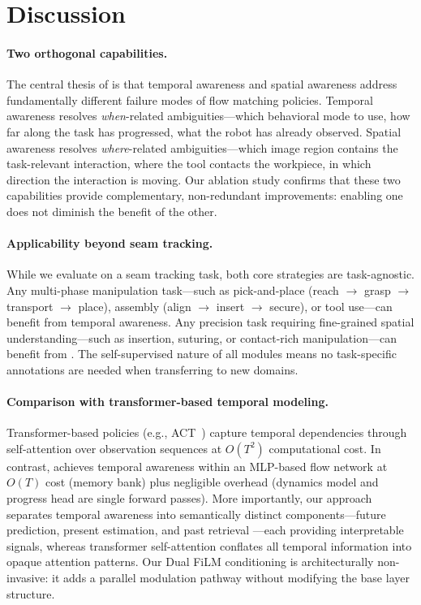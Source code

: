 \section{Discussion}
\label{sec:discussion}

\paragraph{Two orthogonal capabilities.} The central thesis of \method{} is that temporal awareness and spatial awareness address fundamentally different failure modes of flow matching policies. Temporal awareness resolves \emph{when}-related ambiguities---which behavioral mode to use, how far along the task has progressed, what the robot has already observed. Spatial awareness resolves \emph{where}-related ambiguities---which image region contains the task-relevant interaction, where the tool contacts the workpiece, in which direction the interaction is moving. Our ablation study confirms that these two capabilities provide complementary, non-redundant improvements: enabling one does not diminish the benefit of the other.

\paragraph{Applicability beyond seam tracking.} While we evaluate \method{} on a seam tracking task, both core strategies are task-agnostic. Any multi-phase manipulation task---such as pick-and-place (reach $\to$ grasp $\to$ transport $\to$ place), assembly (align $\to$ insert $\to$ secure), or tool use---can benefit from temporal awareness. Any precision task requiring fine-grained spatial understanding---such as insertion, suturing, or contact-rich manipulation---can benefit from \fasa{}. The self-supervised nature of all modules means no task-specific annotations are needed when transferring to new domains.

\paragraph{Comparison with transformer-based temporal modeling.} Transformer-based policies (e.g., ACT~\cite{zhao2023act}) capture temporal dependencies through self-attention over observation sequences at $O(T^2)$ computational cost. In contrast, \method{} achieves temporal awareness within an MLP-based flow network at $O(T)$ cost (memory bank) plus negligible overhead (dynamics model and progress head are single forward passes). More importantly, our approach separates temporal awareness into semantically distinct components---future prediction, present estimation, and past retrieval ---each providing interpretable signals, whereas transformer self-attention conflates all temporal information into opaque attention patterns. Our Dual FiLM conditioning is architecturally non-invasive: it adds a parallel modulation pathway without modifying the base layer structure.

